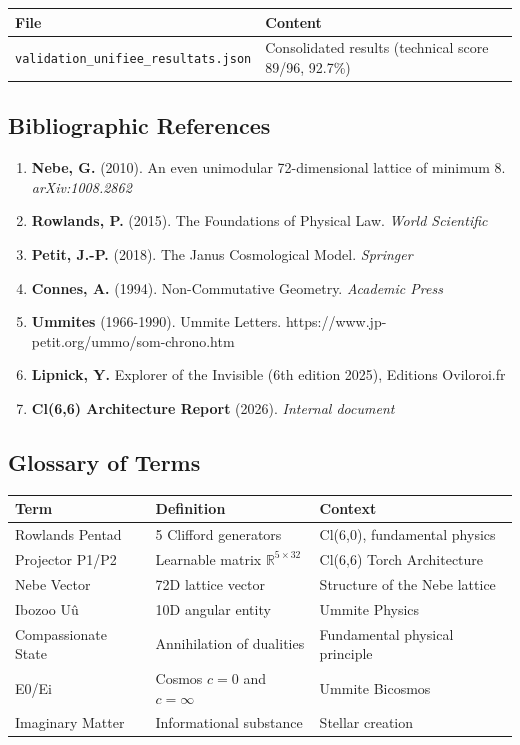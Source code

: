 \documentclass[11pt]{article}
\providecommand{\tightlist}{%
\setlength{\itemsep}{2pt}\setlength{\parskip}{6pt}
}
\begin{document}
\begin{center}
\begin{tabular}{@{}ll@{}}
\toprule
\textbf{File} & \textbf{Content} \\
\midrule
\verb`validation_unifiee_resultats.json` & Consolidated results (technical score 89/96, 92.7\%) \\
\bottomrule
\end{tabular}
\end{center}

\hypertarget{bibliographic-references}{%
\subsection{Bibliographic References}\label{bibliographic-references}}

\begin{enumerate}
\def\labelenumi{\arabic{enumi}.}
\tightlist
\item
  \textbf{Nebe, G.} (2010). An even unimodular 72-dimensional lattice of
  minimum 8. \emph{arXiv:1008.2862}
\item
  \textbf{Rowlands, P.} (2015). The Foundations of Physical Law.
  \emph{World Scientific}
\item
  \textbf{Petit, J.-P.} (2018). The Janus Cosmological Model.
  \emph{Springer}
\item
  \textbf{Connes, A.} (1994). Non-Commutative Geometry. \emph{Academic
  Press}
\item
  \textbf{Ummites} (1966-1990). Ummite Letters.
  https://www.jp-petit.org/ummo/som-chrono.htm
\item
  \textbf{Lipnick, Y.} Explorer of the Invisible (6th edition 2025),
  Editions Oviloroi.fr
\item
  \textbf{Cl(6,6) Architecture Report} (2026). \emph{Internal document}
\end{enumerate}

\hypertarget{glossary-of-terms}{%
\subsection{Glossary of Terms}\label{glossary-of-terms}}

\begin{longtable}{@{}lll@{}}
\toprule
\textbf{Term} & \textbf{Definition} & \textbf{Context} \\
\midrule
Rowlands Pentad & 5 Clifford generators & Cl(6,0), fundamental physics \\
Projector P1/P2 & Learnable matrix $\mathbb{R}^{5\times32}$ & Cl(6,6) Torch Architecture \\
Nebe Vector & 72D lattice vector & Structure of the Nebe lattice \\
Ibozoo Uû & 10D angular entity & Ummite Physics \\
Compassionate State & Annihilation of dualities & Fundamental physical principle \\
E0/Ei & Cosmos $c=0$ and $c=\infty$ & Ummite Bicosmos \\
Imaginary Matter & Informational substance & Stellar creation \\
\bottomrule
\end{longtable}
\end{document}
